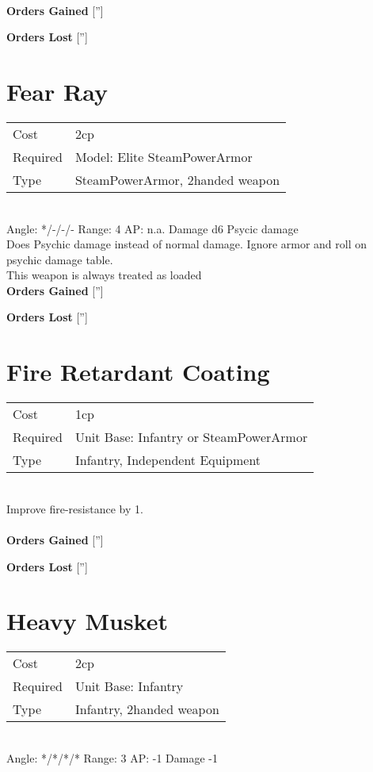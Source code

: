 \ \\

{\bf Orders Gained}
['']

{\bf Orders Lost}
['']
\section{ Fear Ray }

\begin{tabular}{ll}
    Cost & 2cp \\
    Required & Model: Elite SteamPowerArmor\\
    Type & SteamPowerArmor, 2handed weapon\\
\end{tabular}
\ \\
\indent Angle: */-/-/- Range: 4  AP: n.a. Damage d6 Psycic damage \\
Does Psychic damage instead of normal damage. Ignore armor and roll on psychic damage table. \\ This weapon is always treated as loaded
\ \\

{\bf Orders Gained}
['']

{\bf Orders Lost}
['']
\section{ Fire Retardant Coating }

\begin{tabular}{ll}
    Cost & 1cp \\
    Required & Unit Base: Infantry or SteamPowerArmor\\
    Type & Infantry, Independent Equipment\\
\end{tabular}
\ \\
Improve fire-resistance by 1. \\

\ \\

{\bf Orders Gained}
['']

{\bf Orders Lost}
['']
\section{ Heavy Musket }

\begin{tabular}{ll}
    Cost & 2cp \\
    Required & Unit Base: Infantry\\
    Type & Infantry, 2handed weapon\\
\end{tabular}
\ \\
\indent Angle: */*/*/* Range: 3  AP: -1 Damage -1 \\

